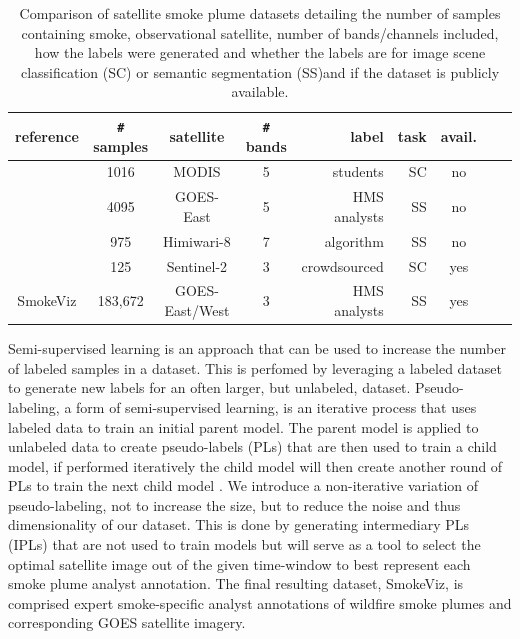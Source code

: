 \documentclass{article}
\begin{document}
\begin{table}[h]
    \caption{Comparison of satellite smoke plume datasets detailing the number of samples containing smoke, observational satellite, number of bands/channels included, how the labels were generated and whether the labels are for image scene classification (SC) or semantic segmentation (SS)and if the dataset is publicly available.}\label{studies}
    \centering
    \begin{tabular}{ccccrrcrc}
        \toprule
        reference & \verb|#| samples & satellite & \verb|#| bands & label & task & avail.\\
        \midrule
        \cite{smokenet}& 1016 & MODIS & 5 & students & SC & no \\
        \cite{smoke_goes}& 4095 & GOES-East & 5 & HMS analysts & SS & no \\
        \cite{larsen} & 975 & Himiwari-8 & 7 & algorithm& SS & no \\
        \cite{satlas} & 125 & Sentinel-2 & 3 & crowdsourced & SC & yes \\
        SmokeViz  & 183,672 & GOES-East/West & 3 & HMS analysts & SS & yes \\
        \bottomrule
    \end{tabular}
\end{table}

Semi-supervised learning is an approach that can be used to increase the number of labeled samples in a dataset. This is perfomed by leveraging a labeled dataset to generate new labels for an often larger, but unlabeled, dataset. Pseudo-labeling, a form of semi-supervised learning, is an iterative process that uses labeled data to train an initial parent model. The parent model is applied to unlabeled data to create pseudo-labels (PLs) that are then used to train a child model, if performed iteratively the child model will then create another round of PLs to train the next child model \cite{pseudo}. We introduce a non-iterative variation of pseudo-labeling, not to increase the size, but to reduce the noise and thus dimensionality of our dataset. This is done by generating intermediary PLs (IPLs) that are not used to train models but will serve as a tool to select the optimal satellite image out of the given time-window to best represent each smoke plume analyst annotation. The final resulting dataset, SmokeViz, is comprised expert smoke-specific analyst annotations of wildfire smoke plumes and corresponding GOES satellite imagery.
\end{document}
